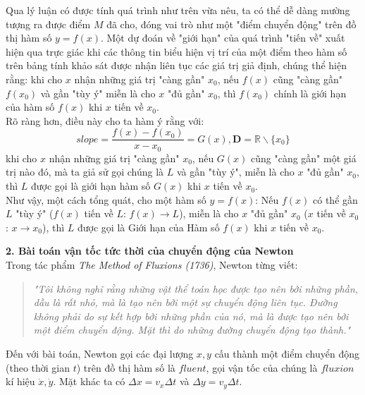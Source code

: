 \documentclass[a4paper,12pt]{article}
\begin{document}
Qua lý luận có được tính quá trình như trên vừa nêu, ta có thể dễ dàng mường tượng ra được điểm $M$ đã cho, đóng vai trò như một "điểm chuyển động" trên đồ thị hàm số $y=f(x)$. Một dự đoán về "giới hạn" của quá trình "tiến về" xuất hiện qua trực giác khi các thông tin biểu hiện vị trí của một điểm theo hàm số trên bảng tính khảo sát được nhận liên tục các giá trị giả định, chúng thể hiện rằng: khi cho $x$ nhận những giá trị "càng gần" $x_0$, nếu $f(x)$ cũng "càng gần" $f(x_0)$ và gần "tùy ý" miễn là cho $x$ "đủ gần" $x_0$, thì $f(x_0)$ chính là giới hạn của hàm số $f(x)$ khi $x$ tiến về $x_0$.\\

Rõ ràng hơn, điều này cho ta hàm ý rằng với: $$slope=\frac{f(x)-f(x_0)}{x-x_0}=G(x),  \mathbf{D}=\mathbb{R}\backslash{\{x_0\}}$$ khi cho $x$ nhận những giá trị "càng gần" $x_0$, nếu $G(x)$ cũng "càng gần" một giá trị nào đó, mà ta giả sử gọi chúng là $L$ và gần "tùy ý", miễn là cho $x$ "đủ gần" $x_0$, thì $L$ được gọi là giới hạn hàm số $G(x)$ khi $x$ tiến về $x_0$.\\

Như vậy, một cách tổng quát, cho một hàm số $y=f(x)$: 
Nếu $f(x)$ có thể gần $L$ "tùy ý" ($f(x)$ tiến về $L$: $f(x) \to L$), miễn là cho $x$ "đủ gần" $x_0$ ($x$ tiến về $x_0$: $x \to x_0$), thì $L$ được gọi là Giới hạn của Hàm số $f(x)$ khi $x$ tiến về $x_0$.\\

\newpage

\textbf{2. Bài toán vận tốc tức thời của chuyển động của Newton}\\

Trong tác phẩm \textit{The Method of Fluxions (1736)}, Newton từng viết: 
\begin{quote}
	\textit{"Tôi không nghĩ rằng những vật thể toán học được tạo nên bởi những phần, dầu là rất nhỏ, mà là tạo nên bởi một sự chuyển động liên tục. Đường không phải do sự kết hợp bởi những phần của nó, mà là được tạo nên bởi một điểm chuyển động. Mặt thì do những đường chuyển động tạo thành."}
\end{quote}

Đến với bài toán, Newton gọi các đại lượng $x,y$ cấu thành một điểm chuyển động (theo thời gian $t$) trên đồ thị hàm số là $fluent$, gọi vận tốc của chúng là $fluxion$ kí hiệu $\dot{x}, \dot{y}$. Mặt khác ta có $\Delta x=v_x\Delta t$ và $\Delta y=v_y\Delta t$.\\
\end{document}
